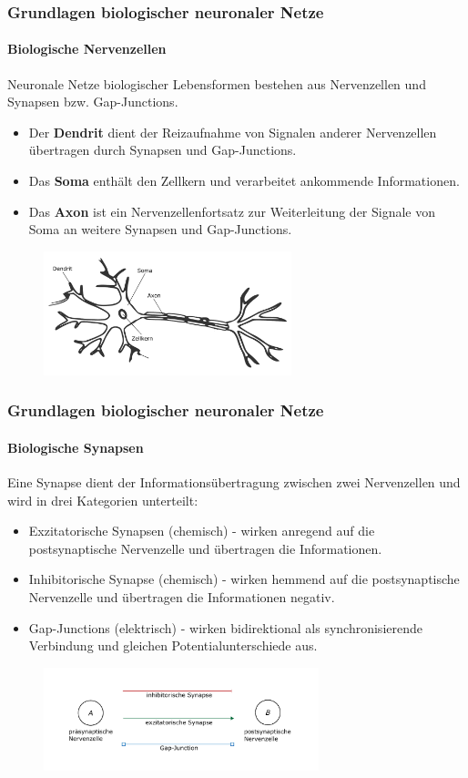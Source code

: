 \documentclass[10pt,t,aspectratio=1610]{beamer}
\newcommand{\ChapterBnn}{Grundlagen biologischer neuronaler Netze}
\begin{document}
\begin{frame}
	\frametitle{\ChapterBnn}
	\framesubtitle{Biologische Nervenzellen}
	\vspace{0.3cm}
	Neuronale Netze biologischer Lebensformen bestehen aus Nervenzellen und Synapsen bzw. Gap-Junctions.
	\vspace{0.2cm}
	\begin{itemize}
		\item Der \textbf{Dendrit} dient der Reizaufnahme von Signalen anderer Nervenzellen übertragen durch Synapsen und Gap-Junctions.
		\item Das \textbf{Soma} enthält den Zellkern und verarbeitet ankommende Informationen.
		\item Das \textbf{Axon} ist ein Nervenzellenfortsatz zur Weiterleitung der Signale von Soma an weitere Synapsen und Gap-Junctions.
	\end{itemize}
	\begin{figure}[H] %
		\centering
		\includegraphics[width=7.2cm]{figures/folie_2/neuron_is.pdf}
		\label{fig:neuron}
	\end{figure}

\end{frame}


\begin{frame}
	\frametitle{\ChapterBnn}
	\framesubtitle{Biologische Synapsen}
	\vspace{0.3cm}
	Eine Synapse dient der Informationsübertragung zwischen zwei Nervenzellen und wird in drei Kategorien unterteilt:
	\vspace{0.2cm}
	\begin{itemize}
		\item Exzitatorische Synapsen (chemisch) - wirken anregend auf die postsynaptische Nervenzelle und übertragen die Informationen.
		\item Inhibitorische Synapse (chemisch) - wirken  hemmend auf die postsynaptische Nervenzelle und übertragen die Informationen negativ.
		\item Gap-Junctions (elektrisch) - wirken bidirektional als synchronisierende Verbindung und gleichen Potentialunterschiede aus.
	\end{itemize}
	\begin{figure}[H] %
		\centering
		\includegraphics[width=8cm]{figures/folie_3/synapse_is.pdf}
		\label{fig:synapse}
	\end{figure}

\end{frame}
\end{document}
